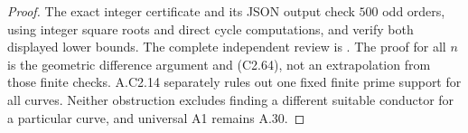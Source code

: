 \begin{proof}
The exact integer certificate
and its JSON output check $500$ odd orders,
using integer square roots and direct cycle
computations, and verify both displayed lower
bounds. The complete independent review is
.
The proof for all $n$ is the geometric difference
argument and (C2.64), not an extrapolation from
those finite checks. A.C2.14 separately rules
out one fixed finite prime support for all
curves. Neither obstruction excludes finding
a different suitable conductor for a particular
curve, and universal A1 remains A.30.
\end{proof}










